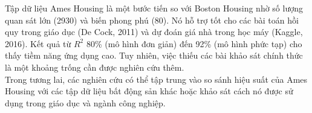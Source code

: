 Tập dữ liệu Ames Housing là một bước tiến so với Boston Housing nhờ số lượng quan sát lớn (2930) và biến phong phú (80). Nó hỗ trợ tốt cho các bài toán hồi quy trong giáo dục  (De Cock, 2011) và dự đoán giá nhà trong học máy (Kaggle, 2016). Kết quả từ $R^2$ 80\% (mô hình đơn giản) đến 92\% (mô hình phức tạp) cho thấy tiềm năng ứng dụng cao. Tuy nhiên, việc thiếu các bài khảo sát chính thức là một khoảng trống cần được nghiên cứu thêm.
\\
Trong tương lai, các nghiên cứu có thể tập trung vào so sánh hiệu suất của Ames Housing với các tập dữ liệu bất động sản khác hoặc khảo sát cách nó được sử dụng trong giáo dục và ngành công nghiệp.

